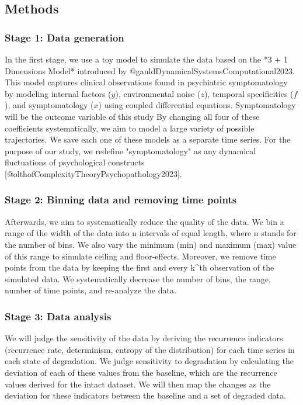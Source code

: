 \documentclass[utf8]{FrontiersinVancouver}
\begin{document}
\subsection{Methods}

\subsubsection{Stage 1: Data generation}

In the first stage, we use a toy model to simulate the data based on the *3 + 1 Dimensions Model* introduced by @gauldDynamicalSystemsComputational2023. This model captures clinical observations found in psychiatric symptomatology by modeling internal factors ($y$), environmental noise ($z$), temporal specificities ($f$), and symptomatology ($x$) using coupled differential equations. Symptomatology will be the outcome variable of this study By changing all four of these coefficients systematically, we aim to model a large variety of possible trajectories. We save each one of these models as a separate time series. For the purpose of our study, we redefine "symptomatology" as any dynamical fluctuations of psychological constructs [@olthofComplexityTheoryPsychopathology2023].

\subsubsection{Stage 2: Binning data and removing time points}

Afterwards, we aim to systematically reduce the quality of the data. We bin a range of the width of the data into n intervals of equal length, where n stands for the number of bins. We also vary the minimum (min) and maximum (max) value of this range to simulate ceiling and floor-effects. Moreover, we remove time points from the data by keeping the first and every k^{th} observation of the simulated data. We systematically decrease the number of bins, the range, number of time points, and re-analyze the data.

\subsubsection{Stage 3: Data analysis}

We will judge the sensitivity of the data by deriving the recurrence indicators (recurrence rate, determinism, entropy of the distribution) for each time series in each state of degradation. We judge sensitivity to degradation by calculating the deviation of each of these values from the baseline, which are the recurrence values derived for the intact dataset. We will then map the changes as the deviation for these indicators between the baseline and a set of degraded data.
\end{document}
